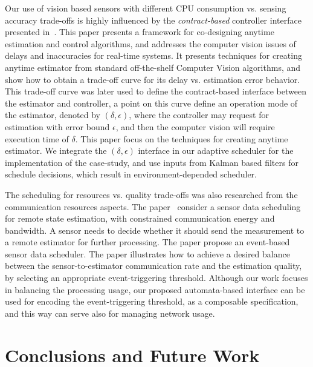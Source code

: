 \documentclass[ twoside, 12pt ]{article}
\begin{document}
Our use of vision based sensors with different CPU consumption vs. sensing accuracy trade-offs is highly influenced by the \textit{contract-based} controller interface presented in~\cite{pant2015co}. This paper presents a framework for co-designing anytime estimation and control algorithms, and addresses the computer vision issues of delays and inaccuracies for real-time systems. It presents techniques for creating anytime estimator from standard off-the-shelf Computer Vision algorithms, and show how to obtain a trade-off curve for its delay vs. estimation error behavior. This trade-off curve was later used to define the contract-based interface between the estimator and controller, a point on this curve define an operation mode of the estimator, denoted by $(\delta , \epsilon)$, where the controller may request for estimation with error bound $\epsilon$, and then the computer vision will require execution time of $\delta$. 
This paper focus on the techniques for creating anytime estimator.
We integrate the $(\delta , \epsilon)$ interface in our adaptive scheduler for the implementation of the case-study, and use inputs from Kalman based filters for schedule decisions, which result in environment-depended scheduler.


The scheduling for resources vs. quality trade-offs was also researched from the communication resources aspects. The paper~\cite{wu2013event} consider a sensor data scheduling for remote state estimation, with constrained communication energy and bandwidth. A sensor needs to decide whether it should send the measurement to a remote estimator for further processing. The paper propose an event-based sensor data scheduler. The paper illustrates how to achieve a desired balance between the sensor-to-estimator communication rate and the estimation quality, by selecting an appropriate event-triggering threshold.
Although our work focuses in balancing the processing usage, our proposed automata-based interface can be used for encoding the event-triggering threshold, as a composable specification, and this way can serve also for managing network usage.

\section{Conclusions and Future Work}

\end{document}
